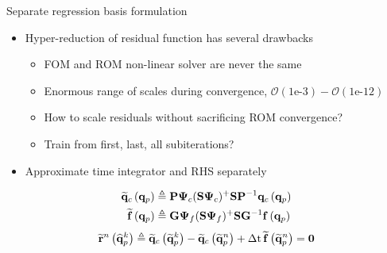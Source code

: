 \documentclass[]{beamer}
\begin{document}
\begin{frame}{Separate regression basis formulation}
    \begin{itemize}
		\item Hyper-reduction of residual function has several drawbacks
		\begin{itemize}
			\item FOM and ROM non-linear solver are never the same
			\item Enormous range of scales during convergence, $\mathcal{O}(1\text{e-}3)-\mathcal{O}(1\text{e-}12)$
			\item How to scale residuals without sacrificing ROM convergence?
			\item Train from first, last, all subiterations?
		\end{itemize}
		\item Approximate time integrator and RHS separately
	\end{itemize}
	\begin{align*}
		\consFuncRom{\primVec} &\triangleq \consScale \deimRegressorCons \consScaleInv \consFunc{\primVec} \\
		\rhsApproxFunc{\primVec} &\triangleq \rhsScale \deimRegressorRhs \rhsScaleInv \rhsFunc{\primVec}
	\end{align*}
	\begin{equation*}
		\mathbf{\widetilde{r}}^{n} \left(\mathbf{\widehat{q}}_p^{k}\right) \triangleq \mathbf{\widetilde{q}}_c \left(\mathbf{\widetilde{q}}_p^{k}\right) - \mathbf{\widetilde{q}}_c \left(\mathbf{\widetilde{q}}_p^{n}\right) + \Delta \text{t} \, \mathbf{\widetilde{\mathbf{f}}}\left(\mathbf{\widetilde{q}}_p^{n}\right) = \mathbf{0}
	\end{equation*}
\end{frame}
\end{document}
